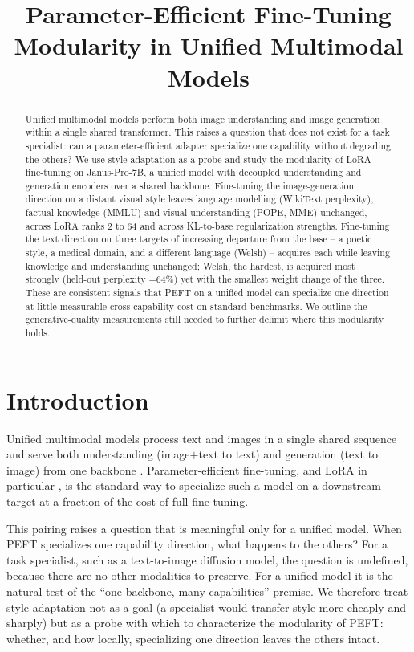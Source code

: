 \documentclass{article}
\title{\vspace{-2.5em}\textbf{Parameter-Efficient Fine-Tuning Modularity in Unified Multimodal Models}\vspace{-1em}}
\author{}
\date{}
\begin{document}
\maketitle

\begin{abstract}
Unified multimodal models perform both image understanding and image generation
within a single shared transformer. This raises a question that does not exist
for a task specialist: can a parameter-efficient adapter specialize one
capability without degrading the others? We use style adaptation as a probe and
study the modularity of LoRA fine-tuning on Janus-Pro-7B, a unified model with
decoupled understanding and generation encoders over a shared backbone.
Fine-tuning the image-generation direction on a distant visual style leaves
language modelling (WikiText perplexity), factual knowledge (MMLU) and visual
understanding (POPE, MME) unchanged, across LoRA ranks 2 to 64 and across
KL-to-base regularization strengths. Fine-tuning the text direction on three
targets of increasing departure from the base -- a poetic style, a medical
domain, and a different language (Welsh) -- acquires each while leaving knowledge
and understanding unchanged; Welsh, the hardest, is acquired most strongly
(held-out perplexity $-64\%$) yet with the smallest weight change of the three.
These are consistent signals that PEFT on a unified model can specialize one
direction at little measurable cross-capability cost on standard benchmarks. We
outline the generative-quality measurements still needed to further delimit where
this modularity holds.
\end{abstract}

\section{Introduction}
Unified multimodal models process text and images in a single shared sequence
and serve both understanding (image$+$text to text) and generation (text to
image) from one backbone \citep{chameleon2024,wu2024janus,lu2024unifiedio2}.
Parameter-efficient fine-tuning, and LoRA in particular \citep{hu2022lora}, is
the standard way to specialize such a model on a downstream target at a fraction
of the cost of full fine-tuning.

This pairing raises a question that is meaningful only for a unified model. When
PEFT specializes one capability direction, what happens to the others? For a task
specialist, such as a text-to-image diffusion model, the question is undefined,
because there are no other modalities to preserve. For a unified model it is the
natural test of the ``one backbone, many capabilities'' premise. We therefore
treat style adaptation not as a goal (a specialist would transfer style more
cheaply and sharply) but as a probe with which to characterize the modularity of
PEFT: whether, and how locally, specializing one direction leaves the others
intact.
\end{document}
